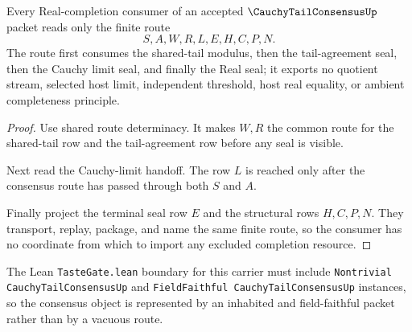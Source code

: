 \begin{theorem}
\label{thm:cauchy-tail-consensus-real-completion-handoff}
Every Real-completion consumer of an accepted $\CauchyTailConsensusUp$ packet reads only the finite route
$$
S,A,W,R,L,E,H,C,P,N.
$$
The route first consumes the shared-tail modulus, then the tail-agreement seal, then the Cauchy limit seal, and finally the Real seal; it exports no quotient stream, selected host limit, independent threshold, host real equality, or ambient completeness principle.
\end{theorem}
\begin{proof}
Use shared route determinacy. It makes $W,R$ the common route for the shared-tail row and the tail-agreement row before any seal is visible.

Next read the Cauchy-limit handoff. The row $L$ is reached only after the consensus route has passed through both $S$ and $A$.

Finally project the terminal seal row $E$ and the structural rows $H,C,P,N$. They transport, replay, package, and name the same finite route, so the consumer has no coordinate from which to import any excluded completion resource.
\end{proof}



The Lean \texttt{TasteGate.lean} boundary for this carrier must include \texttt{Nontrivial CauchyTailConsensusUp} and \texttt{FieldFaithful CauchyTailConsensusUp} instances, so the consensus object is represented by an inhabited and field-faithful packet rather than by a vacuous route.


